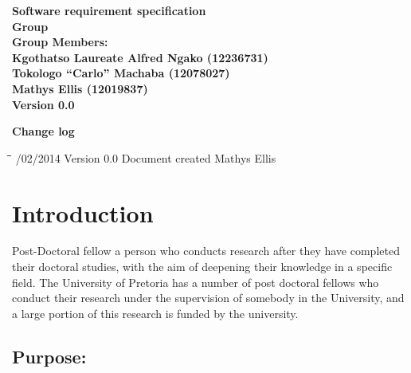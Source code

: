 \documentclass[12pt]{article}
\newcommand{\Title}{Software requirement specification} %
\begin{document}
	\vspace{4em}
	
	\begin{center}%
	
	  \LARGE \bf \Title \\[4em]
	  \LARGE {\bf Group }\\[1em]
	  \LARGE {\bf Group Members:}\\[2em]
	  \large
	     Kgothatso Laureate Alfred Ngako	(12236731) \\[1em]
	     Tokologo “Carlo” Machaba			(12078027) \\[1em]
	     Mathys Ellis						(12019837) \\[8em]
	     {\bf Version 0.0}
	    
	\end{center}%
	
	\newpage
		{\LARGE \bf Change log}\\[2em]
		
		\begin{tabbing}
			\hspace*{2.5cm}\=\hspace*{2.5cm}\=\hspace*{8cm}\=\hspace*{3cm} /02/2014 \> Version 0.0 \> Document created \> Mathys Ellis \\

			
		\end{tabbing}
	
	\newpage
		\tableofcontents	
		
	\newpage
	\section{Introduction} %
	Post-Doctoral fellow a person who conducts research after they have completed their doctoral studies, with the aim of deepening their knowledge in a specific field. The University of Pretoria has a number of post doctoral fellows who conduct their research under the supervision of somebody in the University, and a large portion of this research is funded by the university. 
	\vspace{0.2in}

		\subsection{Purpose:}
		\vspace{0.2in}
		 
	
		\vspace{0.2in}
	
\end{document}
